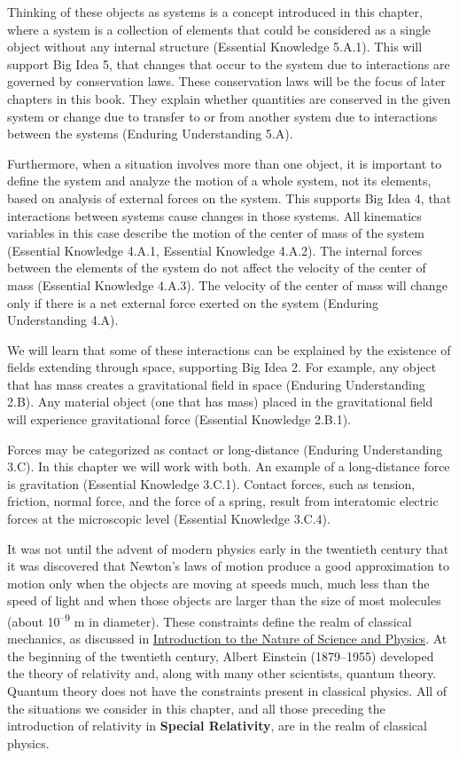 \documentclass[
]{book}
\begin{document}
Thinking of these objects as systems is a concept introduced in this
chapter, where a system is a collection of elements that could be
considered as a single object without any internal structure (Essential
Knowledge 5.A.1). This will support Big Idea 5, that changes that occur
to the system due to interactions are governed by conservation laws.
These conservation laws will be the focus of later chapters in this
book. They explain whether quantities are conserved in the given system
or change due to transfer to or from another system due to interactions
between the systems (Enduring Understanding 5.A).

Furthermore, when a situation involves more than one object, it is
important to define the system and analyze the motion of a whole system,
not its elements, based on analysis of external forces on the system.
This supports Big Idea 4, that interactions between systems cause
changes in those systems. All kinematics variables in this case describe
the motion of the center of mass of the system (Essential Knowledge
4.A.1, Essential Knowledge 4.A.2). The internal forces between the
elements of the system do not affect the velocity of the center of mass
(Essential Knowledge 4.A.3). The velocity of the center of mass will
change only if there is a net external force exerted on the system
(Enduring Understanding 4.A).

We will learn that some of these interactions can be explained by the
existence of fields extending through space, supporting Big Idea 2. For
example, any object that has mass creates a gravitational field in space
(Enduring Understanding 2.B). Any material object (one that has mass)
placed in the gravitational field will experience gravitational force
(Essential Knowledge 2.B.1).

Forces may be categorized as contact or long-distance (Enduring
Understanding 3.C). In this chapter we will work with both. An example
of a long-distance force is gravitation (Essential Knowledge 3.C.1).
Contact forces, such as tension, friction, normal force, and the force
of a spring, result from interatomic electric forces at the microscopic
level (Essential Knowledge 3.C.4).

It was not until the advent of modern physics early in the twentieth
century that it was discovered that Newton's laws of motion produce a
good approximation to motion only when the objects are moving at speeds
much, much less than the speed of light and when those objects are
larger than the size of most molecules (about 10\textsuperscript{--9} m in diameter).
These constraints define the realm of classical mechanics, as discussed
in \href{/m54763}{Introduction to the Nature of Science and Physics}. At the
beginning of the twentieth century, Albert Einstein (1879--1955)
developed the theory of relativity and, along with many other
scientists, quantum theory. Quantum theory does not have the constraints
present in classical physics. All of the situations we consider in this
chapter, and all those preceding the introduction of relativity in
\textbf{Special Relativity}, are in the realm of classical physics.
\end{document}
